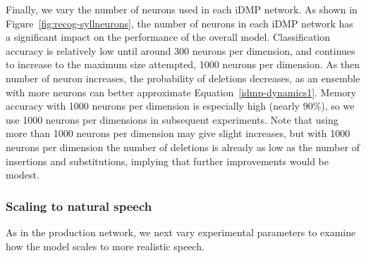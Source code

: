 
Finally, we vary the number of neurons
used in each iDMP network.
As shown in Figure~\ref{fig:recog-syllneurons},
the number of neurons in each iDMP network
has a significant impact on the performance
of the overall model.
Classification accuracy is relatively low
until around 300 neurons per dimension,
and continues to increase
to the maximum size attempted,
1000 neurons per dimension.
As then number of neuron increases,
the probability of deletions decreases,
as an ensemble with more neurons
can better approximate Equation~\eqref{idmp-dynamics1}.
Memory accuracy with 1000 neurons per dimension
is especially high (nearly 90\%),
so we use 1000 neurons per dimensions
in subsequent experiments.
Note that using more than 1000 neurons per dimension
may give slight increases,
but with 1000 neurons per dimension
the number of deletions is already
as low as the number of insertions
and substitutions,
implying that further improvements
would be modest.

\subsubsection{Scaling to natural speech}

As in the production network,
we next vary experimental parameters
to examine how the model scales
to more realistic speech.


